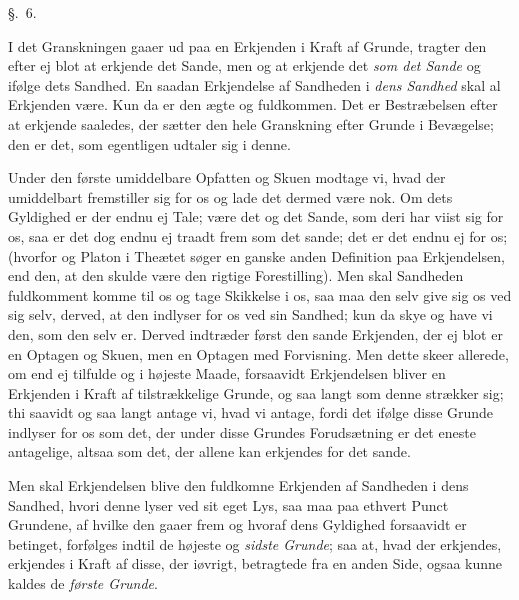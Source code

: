 \documentclass[12pt,a4paper]{book}
\newcommand{\apage}[1]{\marginnote{\footnotesize\textit{[#1]}}}
\begin{document}
\begin{center}\large\S.~6.\end{center} \apage{48} 

I det Granskningen gaaer ud paa en Erkjenden i Kraft af Grunde, tragter den efter
ej blot at erkjende det Sande, men og at erkjende det \emph{som det Sande} og ifølge
dets Sandhed. En saadan Erkjendelse af Sandheden i \emph{dens Sandhed} skal al
Erkjenden være. Kun da er den ægte og fuldkommen. Det er Bestræbelsen efter at
erkjende saaledes, der sætter den hele Granskning efter Grunde i Bevægelse; den er
det, som egentligen udtaler sig i denne.

Under den første umiddelbare Opfatten og Skuen modtage vi, hvad der umiddelbart
fremstiller sig for os og lade det dermed være nok. Om dets Gyldighed er der endnu
ej Tale; være det og det Sande, som deri har viist sig for os, saa er det dog
endnu ej traadt frem som det sande; det er det endnu ej for os; (hvorfor og
Platon i Theætet søger en ganske anden Definition paa Erkjendelsen, end den, at
den skulde være den rigtige Forestilling). Men skal Sandheden fuldkomment komme
til os og tage Skikkelse i os, saa maa den selv give sig os ved sig selv, derved,
at den indlyser for os ved sin Sandhed; kun da skye og have vi den, som den selv
er. Derved indtræder først den sande Erkjenden, der ej blot er en Optagen og
Skuen, men en Optagen med Forvisning. Men dette skeer allerede, om end ej
tilfulde og i højeste \apage{49}  Maade, forsaavidt Erkjendelsen bliver en Erkjenden i Kraft
af tilstrækkelige Grunde, og saa langt som denne strækker sig; thi saavidt og saa
langt antage vi, hvad vi antage, fordi det ifølge disse Grunde indlyser for os
som det, der under disse Grundes Forudsætning er det eneste antagelige, altsaa
som det, der allene kan erkjendes for det sande.

Men skal Erkjendelsen blive den fuldkomne Erkjenden af Sandheden i dens Sandhed,
hvori denne lyser ved sit eget Lys, saa maa paa ethvert Punct Grundene, af
hvilke den gaaer frem og hvoraf dens Gyldighed forsaavidt er betinget, forfølges
indtil de højeste og \emph{sidste Grunde}; saa at, hvad der erkjendes, erkjendes
i Kraft af disse, der iøvrigt, betragtede fra en anden Side, ogsaa kunne kaldes
de \emph{første Grunde}.
\end{document}

